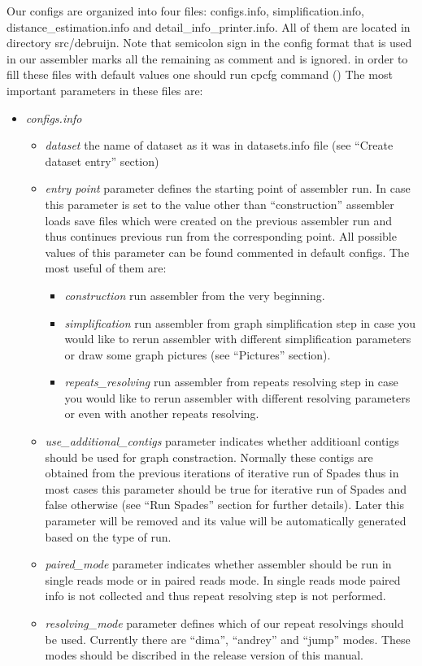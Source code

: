 \documentclass[a4paper,10pt]{article}
\begin{document}
Our configs are organized into four files: configs.info, simplification.info, distance\_estimation.info and detail\_info\_printer.info. All of them are located in directory src/debruijn.
Note that semicolon sign in the config format that is used in our assembler marks all the remaining as comment and is ignored.
in order to fill these files with default values one should run cpcfg command () 
The most important parameters in these files are:

\begin{itemize}
\item {\it configs.info}

\begin{itemize}
\item {\it dataset} the name of dataset as it was in datasets.info file (see ``Create dataset entry'' section)
\item {\it entry point} parameter defines the starting point of assembler run.
In case this parameter is set to the value other than ``construction'' assembler loads save files which were created on the previous assembler run and thus continues previous run from the corresponding point.
All possible values of this parameter can be found commented in default configs.
The most useful of them are:
\begin{itemize}
\item {\it construction} run assembler from the very beginning.
\item {\it simplification} run assembler from graph simplification step in case you would like to rerun assembler with different simplification parameters or draw some graph pictures (see ``Pictures'' section).
\item {\it repeats\_resolving} run assembler from repeats resolving step in case you would like to rerun assembler with different resolving parameters or even with another repeats resolving.
\end{itemize}
\item {\it use_additional_contigs} parameter indicates whether additioanl contigs should be used for graph constraction.
Normally these contigs are obtained from the previous iterations of iterative run of Spades thus in most cases this parameter should be true for iterative run of Spades and false otherwise (see ``Run Spades'' section for further details).
Later this parameter will be removed and its value will be automatically generated based on the type of run.
\item {\it paired\_mode} parameter indicates whether assembler should be run in single reads mode or in paired reads mode. In single reads mode paired info is not collected and thus repeat resolving step is not performed.
\item {\it resolving\_mode} parameter defines which of our repeat resolvings should be used.
Currently there are ``dima'', ``andrey'' and ``jump'' modes.
These modes should be discribed in the release version of this manual. 
\end{itemize}


\end{itemize}
\end{document}
